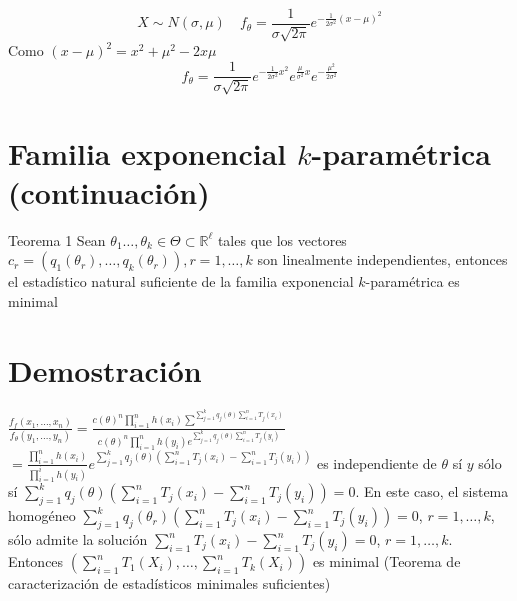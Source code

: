   \[X \sim N(\sigma, \mu) \quad f_\theta = \frac{1}{\sigma \sqrt{2\pi}}e^{-\frac{1}{2\sigma^2}(x - \mu)^2}\]
  Como $(x- \mu)^2 = x^2 + \mu^2 -2x\mu$\\
  \[f_\theta = \frac{1}{\sigma \sqrt{2\pi}}e^{-\frac{1}{2\sigma^2}x^2}e^{\frac{\mu}{\sigma^2}x}e^{-\frac{\mu^2}{2\sigma^2}}\]
  
  \section*{Familia exponencial $k$-paramétrica (continuación)}
  Teorema 1 Sean $\theta_{1} \ldots, \theta_{k} \in \Theta \subset \mathbb{R}^{\ell}$ tales que los vectores $c_{r}=\left(q_{1}\left(\theta_{r}\right), \ldots, q_{k}\left(\theta_{r}\right)\right), r=1, \ldots, k$ son linealmente independientes, entonces el estadístico natural suficiente de la familia exponencial $k$-paramétrica es minimal
  
  \section*{Demostración}
  $\frac{f_{f}\left(x_{1}, \ldots, x_{n}\right)}{f_{\theta}\left(y_{1}, \ldots, y_{n}\right)}=\frac{c(\theta)^{n} \prod_{i=1}^{n} h\left(x_{i}\right) \sum^{\sum_{j=1}^{k} q_{j}(\theta) \sum_{i=1}^{n} T_{j}\left(x_{i}\right)}}{c(\theta)^{n} \prod_{i=1}^{n} h\left(y_{i}\right) e^{\sum_{j=1}^{k} q_{j}(\theta) \sum_{i=1}^{n} T_{j}\left(y_{i}\right)}}$\\
  $=\frac{\prod_{i=1}^{n} h\left(x_{i}\right)}{\prod_{i=1}^{i} h\left(y_{i}\right)} e^{\sum_{j=1}^{k} q_{j}(\theta)\left(\sum_{i=1}^{n} T_{j}\left(x_{i}\right)-\sum_{i=1}^{n} T_{j}\left(y_{i}\right)\right)}$ es independiente de $\theta$ sí $y$ sólo sí $\sum_{j=1}^{k} q_{j}(\theta)\left(\sum_{i=1}^{n} T_{j}\left(x_{i}\right)-\sum_{i=1}^{n} T_{j}\left(y_{i}\right)\right)=0$. En este caso, el sistema homogéneo $\sum_{j=1}^{k} q_{j}\left(\theta_{r}\right)\left(\sum_{i=1}^{n} T_{j}\left(x_{i}\right)-\sum_{i=1}^{n} T_{j}\left(y_{i}\right)\right)=0$, $r=1, \ldots, k$, sólo admite la solución $\sum_{i=1}^{n} T_{j}\left(x_{i}\right)-\sum_{i=1}^{n} T_{j}\left(y_{i}\right)=0$, $r=1, \ldots, k$. Entonces $\left(\sum_{i=1}^{n} T_{1}\left(X_{i}\right), \ldots, \sum_{i=1}^{n} T_{k}\left(X_{i}\right)\right)$ es minimal (Teorema de caracterización de estadísticos minimales suficientes)
  
